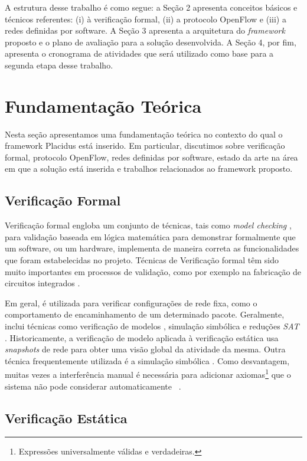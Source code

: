 \documentclass[12pt]{article}
\begin{document}
A estrutura desse trabalho é como segue: a Seção 2 apresenta conceitos básicos e técnicos referentes: (i) à verificação formal, (ii) a protocolo OpenFlow e (iii) a redes definidas por software.
A Seção 3 apresenta a arquitetura do \textit{framework} proposto e o plano de avaliação para a solução desenvolvida.
A Seção 4, por fim, apresenta o cronograma de atividades que será utilizado como base para a segunda etapa desse trabalho.

\section{Fundamentação Teórica}

Nesta seção apresentamos uma fundamentação teórica no contexto do qual o framework Placidus está inserido. Em particular, discutimos sobre verificação formal, protocolo OpenFlow, redes definidas por software, estado da arte na área em que a solução está inserida e trabalhos relacionados ao framework proposto.

\subsection{Verificação Formal}

Verificação formal engloba um conjunto de técnicas, tais como \textit{model checking} \cite{8914133}, para validação baseada em lógica matemática para demonstrar formalmente que um software, ou um hardware, implementa de maneira correta as funcionalidades que foram estabelecidas no projeto.
Técnicas de Verificação formal têm sido muito importantes em processos de validação, como por exemplo na fabricação de circuitos integrados \cite{8894278}.

Em geral, é utilizada para verificar configurações de rede fixa, como o comportamento de encaminhamento de um determinado pacote. Geralmente, inclui técnicas como verificação de modelos \cite{655848}, simulação simbólica \cite{7127376} e reduções \textit{SAT} \cite{5958483}. Historicamente, a verificação de modelo aplicada à verificação estática usa \textit{snapshots} de rede para obter uma visão global da atividade da mesma. Outra técnica frequentemente utilizada é a simulação simbólica \cite{7059250}. 
Como desvantagem, muitas vezes a interferência manual é necessária para adicionar axiomas\footnote{Expressões universalmente válidas e verdadeiras.} que o sistema não pode considerar automaticamente~ \cite{ModelCheckerSDN}.

\subsection{Verificação Estática}
\end{document}
